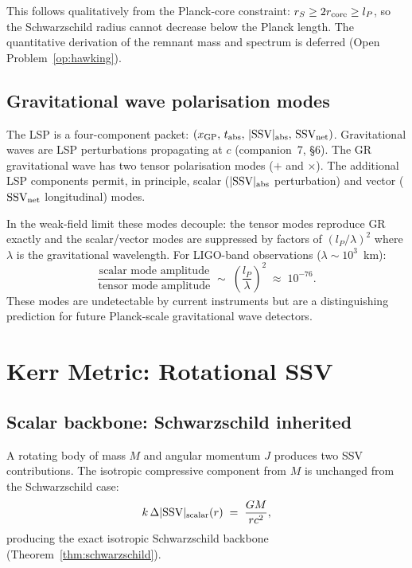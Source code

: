 \documentclass[12pt]{article}
\newcommand{\lP}{l_P}
\newcommand{\SSV}{\text{SSV}}
\begin{document}
This follows qualitatively from the Planck-core constraint:
$r_S \geq 2r_{\rm core} \geq \lP$, so the Schwarzschild radius cannot
decrease below the Planck length.  The quantitative derivation of the
remnant mass and spectrum is deferred (Open Problem~\ref{op:hawking}).

\subsection{Gravitational wave polarisation modes}
\label{subsec:gw}

The LSP is a four-component packet:
$(x_{\rm GP},\, t_{\rm abs},\, |\SSV|_{\rm abs},\, \SSV_{\rm net})$.
Gravitational waves are LSP perturbations propagating at $c$
(companion~7, §6).  The GR gravitational wave has two tensor
polarisation modes ($+$ and $\times$).  The additional LSP components
permit, in principle, scalar ($|\SSV|_{\rm abs}$ perturbation) and
vector ($\SSV_{\rm net}$ longitudinal) modes.

In the weak-field limit these modes decouple: the tensor modes
reproduce GR exactly and the scalar/vector modes are suppressed by
factors of $(\lP/\lambda)^2$ where $\lambda$ is the gravitational
wavelength.  For LIGO-band observations ($\lambda \sim 10^3$~km):
\begin{equation}
  \frac{\text{scalar mode amplitude}}{\text{tensor mode amplitude}}
  \;\sim\; \left(\frac{\lP}{\lambda}\right)^2
  \;\approx\; 10^{-76}.
\end{equation}
These modes are undetectable by current instruments but are a
distinguishing prediction for future Planck-scale gravitational
wave detectors.

\section{Kerr Metric: Rotational SSV}
\label{sec:kerr}

\subsection{Scalar backbone: Schwarzschild inherited}
\label{subsec:kerr_scalar}

A rotating body of mass $M$ and angular momentum $J$ produces two
SSV contributions.  The isotropic compressive component from $M$ is
unchanged from the Schwarzschild case:
\begin{equation}
  k\,\Delta|\SSV|_{\rm scalar}(r) \;=\; \frac{GM}{rc^2},
  \label{eq:kerr_scalar}
\end{equation}
producing the exact isotropic Schwarzschild backbone
(Theorem~\ref{thm:schwarzschild}).
\end{document}
